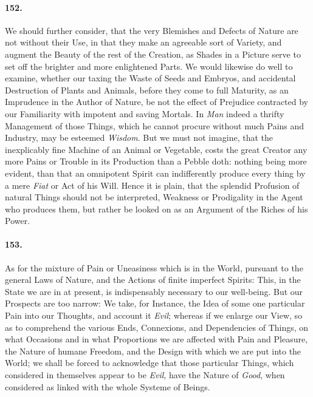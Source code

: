 \documentclass[]{article}
\newenvironment{sectionbody}{}{}
\begin{document}
\begin{sectionbody}
\paragraph{152.} We should further consider, that the very Blemishes and Defects
of Nature are not without their Use, in that they make an
agreeable sort of Variety, and augment the Beauty of the rest of
the Creation, as Shades in a Picture serve to set off the
brighter and more enlightened Parts.  We would likewise do well
to examine, whether our taxing the Waste of Seeds and Embryos,
and accidental Destruction of Plants and Animals, before they
come to full Maturity, as an Imprudence in the Author of Nature,
be not the effect of Prejudice contracted by our Familiarity with
impotent and saving Mortals.  In \emph{Man} indeed a thrifty
Management of those Things, which he cannot procure without much
Pains and Industry, may be esteemed \emph{Wisdom}.  But we must
not imagine, that the inexplicably fine Machine of an Animal or
Vegetable, costs the great {\sc Creator} any more Pains or
Trouble in its Production than a Pebble doth: nothing being more
evident, than that an omnipotent Spirit can indifferently produce
every thing by a mere \emph{Fiat} or Act of his Will.  Hence it
is plain, that the splendid Profusion of natural Things should
not be interpreted, Weakness or Prodigality in the Agent who
produces them, but rather be looked on as an Argument of the
Riches of his Power.



\paragraph{153.} As for the mixture of Pain or Uneasiness which is in the World,
pursuant to the general Laws of Nature, and the Actions of finite
imperfect Spirits: This, in the State we are in at present, is
indispensably necessary to our well-being.  But our Prospects are
too narrow: We take, for Instance, the Idea of some one
particular Pain into our Thoughts, and account it \emph{Evil};
whereas if we enlarge our View, so as to comprehend the various
Ends, Connexions, and Dependencies of Things, on what Occasions
and in what Proportions we are affected with Pain and Pleasure,
the Nature of humane Freedom, and the Design with which we are
put into the World; we shall be forced to acknowledge that those
particular Things, which considered in themselves appear to be
\emph{Evil}, have the Nature of \emph{Good}, when considered
as linked with the whole Systeme of Beings.




\end{sectionbody}
\end{document}
